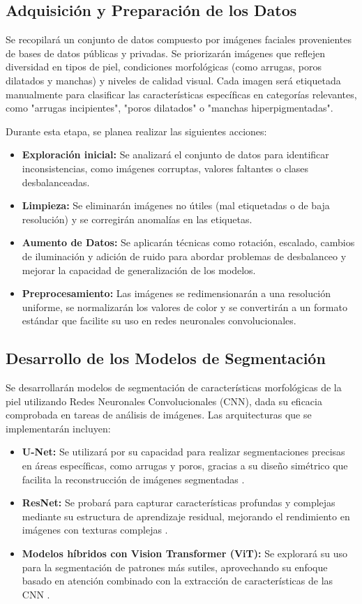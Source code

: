 \subsection{Adquisición y Preparación de los Datos}
Se recopilará un conjunto de datos compuesto por imágenes faciales provenientes de bases de datos públicas y privadas. Se priorizarán imágenes que reflejen diversidad en tipos de piel, condiciones morfológicas (como arrugas, poros dilatados y manchas) y niveles de calidad visual. Cada imagen será etiquetada manualmente para clasificar las características específicas en categorías relevantes, como "arrugas incipientes", "poros dilatados" o "manchas hiperpigmentadas".

Durante esta etapa, se planea realizar las siguientes acciones:
\begin{itemize}
    \item \textbf{Exploración inicial:} Se analizará el conjunto de datos para identificar inconsistencias, como imágenes corruptas, valores faltantes o clases desbalanceadas.
    \item \textbf{Limpieza:} Se eliminarán imágenes no útiles (mal etiquetadas o de baja resolución) y se corregirán anomalías en las etiquetas.
    \item \textbf{Aumento de Datos:} Se aplicarán técnicas como rotación, escalado, cambios de iluminación y adición de ruido para abordar problemas de desbalanceo y mejorar la capacidad de generalización de los modelos.
    \item \textbf{Preprocesamiento:} Las imágenes se redimensionarán a una resolución uniforme, se normalizarán los valores de color y se convertirán a un formato estándar que facilite su uso en redes neuronales convolucionales.
\end{itemize}

\subsection{Desarrollo de los Modelos de Segmentación}
Se desarrollarán modelos de segmentación de características morfológicas de la piel utilizando Redes Neuronales Convolucionales (CNN), dada su eficacia comprobada en tareas de análisis de imágenes. Las arquitecturas que se implementarán incluyen:

\begin{itemize}
    \item \textbf{U-Net:} Se utilizará por su capacidad para realizar segmentaciones precisas en áreas específicas, como arrugas y poros, gracias a su diseño simétrico que facilita la reconstrucción de imágenes segmentadas \cite{ronneberger2015}.
    \item \textbf{ResNet:} Se probará para capturar características profundas y complejas mediante su estructura de aprendizaje residual, mejorando el rendimiento en imágenes con texturas complejas \cite{he2016}.
    \item \textbf{Modelos híbridos con Vision Transformer (ViT):} Se explorará su uso para la segmentación de patrones más sutiles, aprovechando su enfoque basado en atención combinado con la extracción de características de las CNN \cite{dosovitskiy2020}.
\end{itemize}

